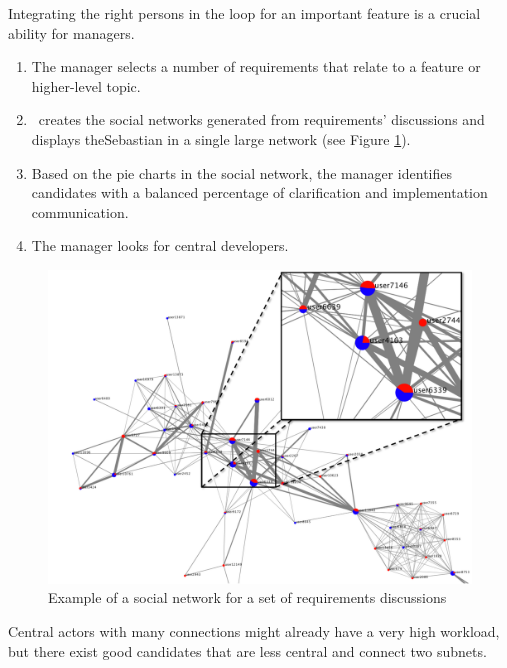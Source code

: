 Integrating the right persons in the loop for an important feature is a crucial ability for managers.
\begin{enumerate}
\item The manager selects a number of requirements that relate to a feature or higher-level topic. 
\item \viss\ creates the social networks generated from requirements' discussions and displays theSebastian in a single large network (see Figure \ref{fig:example-sn-large}).
\item Based on the pie charts in the social network, the manager identifies candidates with a balanced percentage of clarification and implementation communication.
\item The manager looks for central developers. 
\end{enumerate}
\begin{figure}
\includegraphics[width=\columnwidth]{img/example-sn-large}
\caption{Example of a social network for a set of requirements discussions}
\label{fig:example-sn-large}
\end{figure}
Central actors with many connections might already have a very high workload, but there exist good candidates that are less central and connect two subnets.
